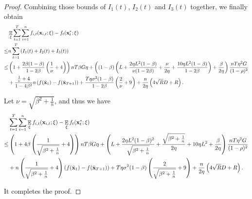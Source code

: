 \documentclass{article}
\begin{document}
\begin{proof}
Combining those bounds of $I_1(t)$, $I_2(t)$ and $I_3(t)$ together, we finally obtain
\begin{align}
\nonumber
& \mathop{\mathbb{E}}_{\xi} \sum_{t=1}^T\sum_{i=1}^n f_{i,t}({\bf x}_{i,t};\xi) - f_t({\bf x}_t^\ast;\xi) \\ \nonumber
\le & n \sum_{t=1}^T \left(  I_1(t) + I_2(t) + I_3(t)  \right) \\ \nonumber
\le & \left( 1 + \frac{2\beta(1-\beta)}{1-2\beta}\left( \frac{1}{\nu}+4 \right) \right)nT\beta G \eta + \left(  (1-\beta)  \left(  L + \frac{2\eta L^2(1-\beta)}{\nu(1-2\beta)} + \frac{\nu}{2\eta} + \frac{10\eta L^2(1-\beta)}{1-2\beta}  \right) + \frac{\beta}{2\eta}  \right) \frac{nT\eta^2 G}{(1-\rho)^2} \\ \nonumber 
&+ \frac{\frac{1}{\nu} + 4}{1-4\beta^2}n\left( f(\bar{{\bf x}}_1) - f(\bar{{\bf x}}_{T+1}) \right)  + \frac{T\eta \sigma^2 (1-\beta)}{1-2\beta}\left( \frac{2}{\nu}+9 \right)  + \frac{n}{2\eta}\left(  4\sqrt{R}D + R   \right).
\end{align} 

Let $\nu = \sqrt{\beta^2 + \frac{1}{n}} $, and thus we have
\begin{align}
\nonumber
&\sum_{t=1}^T\sum_{i=1}^n \mathop{\mathbb{E}}_{\xi} f_{i,t}({\bf x}_{i,t};\xi) - \mathop{\mathbb{E}}_{\xi} f_t({\bf x}_t^\ast;\xi) \\ \nonumber
\le & \left( 1 + 4\beta\left( \frac{1}{\sqrt{\beta^2 + \frac{1}{n}}}+4 \right) \right)nT\beta G \eta + \left(  L + \frac{2\eta L^2(1-\beta)^2}{\sqrt{\beta^2 + \frac{1}{n}}} + \frac{\sqrt{\beta^2 + \frac{1}{n}}}{2\eta} + 10\eta L^2  + \frac{\beta}{2\eta}  \right) \frac{nT \eta^2 G}{(1-\rho)^2} \\ \nonumber 
&+ n\left( \frac{1}{\sqrt{\beta^2 + \frac{1}{n}}} + 4 \right)\left( f(\bar{{\bf x}}_1) - f(\bar{{\bf x}}_{T+1}) \right) + T\eta \sigma^2 (1-\beta)\left( \frac{2}{\sqrt{\beta^2 + \frac{1}{n}}}+9 \right)   + \frac{n}{2\eta}\left(  4\sqrt{R}D + R   \right).
\end{align}





It completes the proof.









\end{proof}
\end{document}
